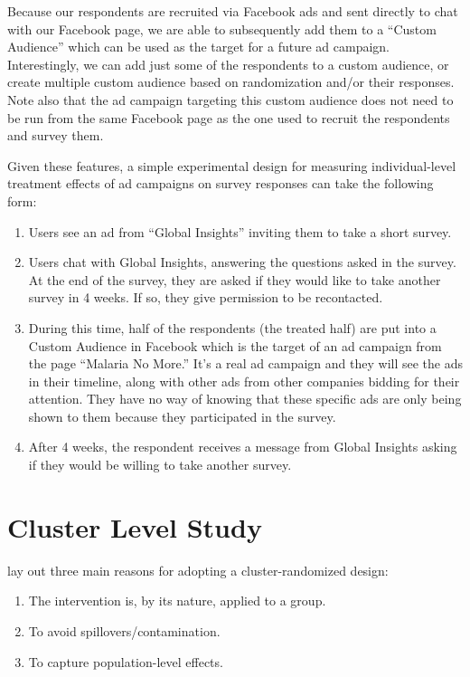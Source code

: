 \documentclass[a4paper,12pt]{article}
\begin{document}
Because our respondents are recruited via Facebook ads and sent directly to chat with our Facebook page, we are able to subsequently add them to a ``Custom Audience'' which can be used as the target for a future ad campaign. Interestingly, we can add just some of the respondents to a custom audience, or create multiple custom audience based on randomization and/or their responses. Note also that the ad campaign targeting this custom audience does not need to be run from the same Facebook page as the one used to recruit the respondents and survey them.

Given these features, a simple experimental design for measuring individual-level treatment effects of ad campaigns on survey responses can take the following form:

\begin{enumerate}
\item Users see an ad from ``Global Insights'' inviting them to take a short survey.
\item Users chat with Global Insights, answering the questions asked in the survey. At the end of the survey, they are asked if they would like to take another survey in 4 weeks. If so, they give permission to be recontacted.
\item During this time, half of the respondents (the treated half) are put into a Custom Audience in Facebook which is the target of an ad campaign from the page ``Malaria No More.'' It's a real ad campaign and they will see the ads in their timeline, along with other ads from other companies bidding for their attention. They have no way of knowing that these specific ads are only being shown to them because they participated in the survey.
\item After 4 weeks, the respondent receives a message from Global Insights asking if they would be willing to take another survey.
\end{enumerate}



\section{Cluster Level Study}

\cite{Hayes2017} lay out three main reasons for adopting a cluster-randomized design:

\begin{enumerate}
\item The intervention is, by its nature, applied to a group.
\item To avoid spillovers/contamination.
\item To capture population-level effects.
\end{enumerate}
\end{document}

